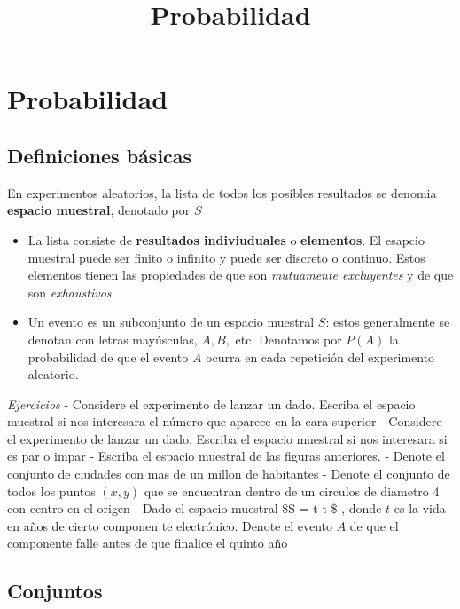 \documentclass[11pt]{article}
\title{Probabilidad}
\begin{document}
    
    \maketitle
    
    

    
    \hypertarget{probabilidad}{%
\section{Probabilidad}\label{probabilidad}}

    \hypertarget{definiciones-buxe1sicas}{%
\subsection{Definiciones básicas}\label{definiciones-buxe1sicas}}

En experimentos aleatorios, la lista de todos los posibles resultados se
denomia \textbf{espacio muestral}, denotado por \(S\)

\begin{itemize}
\item
  La lista consiste de \textbf{resultados indiviuduales} o
  \textbf{elementos}. El esapcio muestral puede ser finito o infinito y
  puede ser discreto o continuo. Estos elementos tienen las propiedades
  de que son \emph{mutuamente excluyentes} y de que son
  \emph{exhaustivos}.
\item
  Un evento es un subconjunto de un espacio muestral \(S\): estos
  generalmente se denotan con letras mayúsculas, \(A, B,\) etc.
  Denotamos por \(P(A)\) la probabilidad de que el evento \(A\) ocurra
  en cada repetición del experimento aleatorio.
\end{itemize}

\emph{Ejercicios} - Considere el experimento de lanzar un dado. Escriba
el espacio muestral si nos interesara el número que aparece en la cara
superior - Considere el experimento de lanzar un dado. Escriba el
espacio muestral si nos interesara si es par o impar - Escriba el
espacio muestral de las figuras anteriores. - Denote el conjunto de
ciudades con mas de un millon de habitantes - Denote el conjunto de
todos los puntos \((x,y)\) que se encuentran dentro de un circulos de
diametro 4 con centro en el origen - Dado el espacio muestral \$S =
\lbrace t \vert t  \rbrace \$ , donde \(t\) es la vida en años de
cierto componen te electrónico. Denote el evento \(A\) de que el
componente falle antes de que finalice el quinto año

    \hypertarget{conjuntos}{%
\subsection{Conjuntos}\label{conjuntos}}
\end{document}

